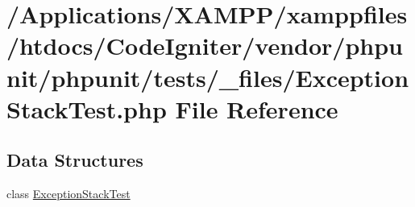 \hypertarget{_exception_stack_test_8php}{}\section{/\+Applications/\+X\+A\+M\+P\+P/xamppfiles/htdocs/\+Code\+Igniter/vendor/phpunit/phpunit/tests/\+\_\+files/\+Exception\+Stack\+Test.php File Reference}
\label{_exception_stack_test_8php}
\subsection*{Data Structures}
\begin{DoxyCompactItemize}
\item 
class \mbox{\hyperlink{class_exception_stack_test}{Exception\+Stack\+Test}}
\end{DoxyCompactItemize}

